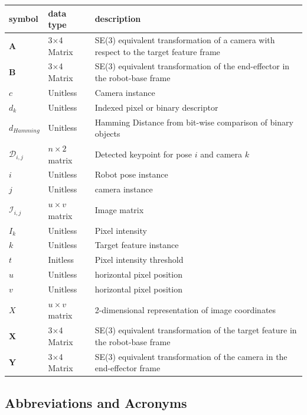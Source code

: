 \documentclass[12pt]{article}
\begin{document}
\renewcommand{\arraystretch}{1.2}
\noindent \begin{longtable*}{l l p{12cm}} \toprule
\textbf{symbol} & \textbf{data type} & \textbf{description}\\
\midrule 
$\textbf{A}$ & 3$\times$4 Matrix & SE(3) equivalent transformation of a camera 
with respect to the target feature frame
\\
$\textbf{B}$ & 3$\times$4 Matrix & SE(3) equivalent transformation of the 
end-effector in the robot-base frame
\\
$c$ &	Unitless & Camera instance
\\
$d_{k}$ & Unitless & Indexed pixel or binary descriptor 
\\
$d_{Hamming}$ & Unitless & Hamming Distance from bit-wise comparison of binary objects
\\
$\mathit{\mathcal{D}_{i, j}}$ & $n \times 2$ matrix & Detected keypoint for pose $i$
and camera $k$
\\
$i$ & Unitless & Robot pose instance
\\
$j$ & Unitless & camera instance
\\
$\mathit{\mathcal{I}_{i, j}}$ & $u \times v$ matrix & Image matrix
\\
$I_{k}$ & Unitless & Pixel intensity
\\
$k$ &	Unitless & Target feature instance
\\
$t$ & Initless & Pixel intensity threshold
\\
$u$ & Unitless & horizontal pixel position
\\
$v$ & Unitless & horizontal pixel position
\\
$\mathit{X}$ & $u \times v$ matrix & 2-dimensional representation of image coordinates 
\\
$\textbf{X}$ & 3$\times$4 Matrix & SE(3) equivalent transformation of the target 
feature in the robot-base frame
\\
$\textbf{Y}$ & 3$\times$4 Matrix & SE(3) equivalent transformation of the camera 
in the end-effector frame
\\ 
\bottomrule
\end{longtable*}

\subsection{Abbreviations and Acronyms}
\end{document}

